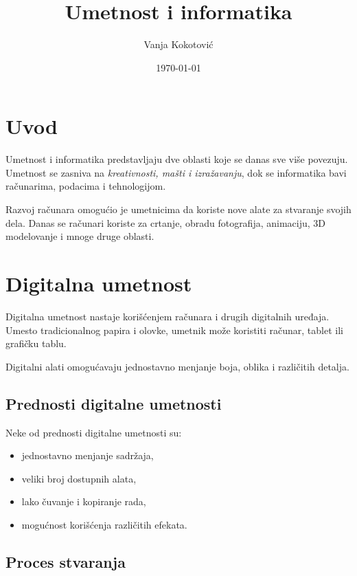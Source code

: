 \documentclass[a4paper,12pt]{article}
\title{\textbf{Umetnost i informatika}}
\author{Vanja Kokotović}
\date{\today}
\begin{document}
\maketitle

\tableofcontents

\newpage

\section{Uvod}

Umetnost i informatika predstavljaju dve oblasti koje se danas
sve više povezuju. Umetnost se zasniva na \textit{kreativnosti,
mašti i izražavanju}, dok se informatika bavi računarima,
podacima i tehnologijom.

Razvoj računara omogućio je umetnicima da koriste nove alate
za stvaranje svojih dela. Danas se računari koriste za crtanje,
obradu fotografija, animaciju, 3D modelovanje i mnoge druge
oblasti.

\section{Digitalna umetnost}

Digitalna umetnost nastaje korišćenjem računara i drugih
digitalnih uređaja. Umesto tradicionalnog papira i olovke,
umetnik može koristiti računar, tablet ili grafičku tablu.

Digitalni alati omogućavaju jednostavno menjanje boja,
oblika i različitih detalja.

\subsection{Prednosti digitalne umetnosti}

Neke od prednosti digitalne umetnosti su:

\begin{itemize}
    \item jednostavno menjanje sadržaja,
    \item veliki broj dostupnih alata,
    \item lako čuvanje i kopiranje rada,
    \item mogućnost korišćenja različitih efekata.
\end{itemize}

\subsection{Proces stvaranja}
\end{document}
